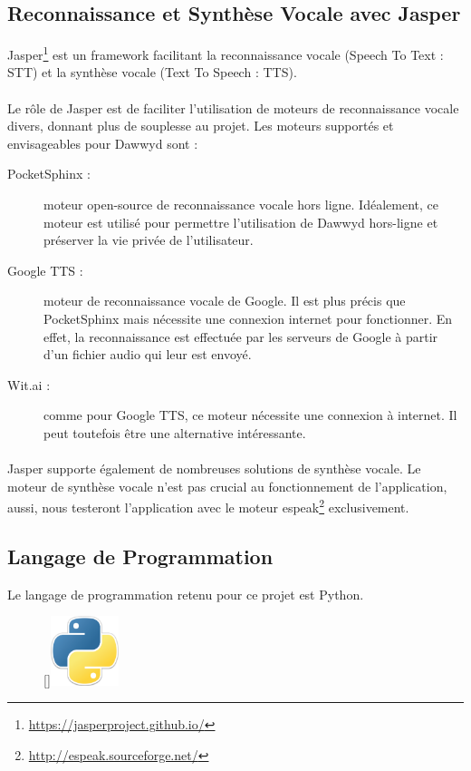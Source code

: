 \documentclass[12pt]{article}
\begin{document}
	    \subsection{Reconnaissance et Synthèse Vocale avec Jasper}
	    Jasper\footnote{\url{https://jasperproject.github.io/}} est un framework facilitant la reconnaissance vocale (Speech To Text : STT) et la synthèse vocale (Text To Speech : TTS).
	    
	    \paragraph{}
	    Le rôle de Jasper est de faciliter l'utilisation de moteurs de reconnaissance vocale divers, donnant plus de souplesse au projet. Les moteurs supportés et envisageables pour Dawwyd sont :
	    
	    \begin{description}
	    	\item[PocketSphinx :] moteur open-source de reconnaissance vocale hors ligne. Idéalement, ce moteur est utilisé pour permettre l'utilisation de Dawwyd hors-ligne et préserver la vie privée de l'utilisateur.
	    	\item[Google TTS :] moteur de reconnaissance vocale de Google. Il est plus précis que PocketSphinx mais nécessite une connexion internet pour fonctionner. En effet, la reconnaissance est effectuée par les serveurs de Google à partir d'un fichier audio qui leur est envoyé.
	    	\item[Wit.ai :] comme pour Google TTS, ce moteur nécessite une connexion à internet. Il peut toutefois être une alternative intéressante.
	    \end{description}
	    
	    \paragraph{}
	    Jasper supporte également de nombreuses solutions de synthèse vocale. Le moteur de synthèse vocale n'est pas crucial au fonctionnement de l'application, aussi, nous testeront l'application avec le moteur espeak\footnote{\url{http://espeak.sourceforge.net/}} exclusivement.
    
        \subsection{Langage de Programmation}

        Le langage de programmation retenu pour ce projet est Python.
                \begin{figure}
                	\centering
                	\raisebox{0pt}[\dimexpr{}\baselineskip\relax]{\includegraphics[width=2cm]{logo-python}}
                	\caption[Logo de Python]{}
                \end{figure}
        
\end{document}
